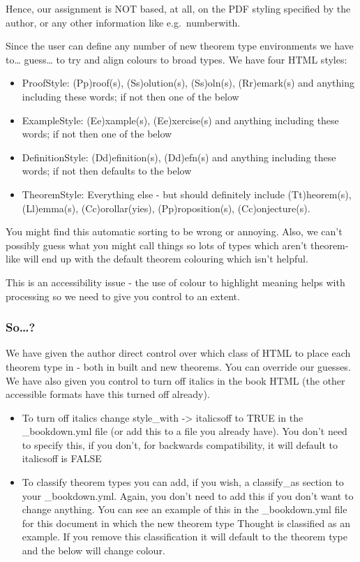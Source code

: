 \documentclass[
  10pt,
  a4paper]{article}
\providecommand{\tightlist}{%
  \setlength{\itemsep}{0pt}\setlength{\parskip}{0pt}}
\theoremstyle{plain}
\theoremstyle{definition}
\theoremstyle{plain}
\theoremstyle{plain}
\theoremstyle{plain}
\theoremstyle{plain}
\theoremstyle{definition}
\theoremstyle{definition}
\theoremstyle{remark}
\theoremstyle{remark}
\begin{document}
Hence, our assignment is NOT based, at all, on the PDF styling specified by the author, or any other information like e.g.~numberwith.

Since the user can define any number of new theorem type environments we have to\ldots{} guess\ldots{} to try and align colours to broad types. We have four HTML styles:

\begin{itemize}
\tightlist
\item
  ProofStyle: (P\textbar p)roof(s), (S\textbar s)olution(s), (S\textbar s)oln(s), (R\textbar r)emark(s) and anything including these words; if not then one of the below
\item
  ExampleStyle: (E\textbar e)xample(s), (E\textbar e)xercise(s) and anything including these words; if not then one of the below
\item
  DefinitionStyle: (D\textbar d)efinition(s), (D\textbar d)efn(s) and anything including these words; if not then defaults to the below
\item
  TheoremStyle: Everything else - but should definitely include (T\textbar t)heorem(s), (L\textbar l)emma(s), (C\textbar c)orollar(y\textbar ies), (P\textbar p)roposition(s), (C\textbar c)onjecture(s).
\end{itemize}

You might find this automatic sorting to be wrong or annoying. Also, we can't possibly guess what you might call things so lots of types which aren't theorem-like will end up with the default theorem colouring which isn't helpful.

This is an accessibility issue - the use of colour to highlight meaning helps with processing so we need to give you control to an extent.

\hypertarget{so}{%
\subsubsection{So\ldots?}\label{so}}

We have given the author direct control over which class of HTML to place each theorem type in - both in built and new theorems. You can override our guesses. We have also given you control to turn off italics in the book HTML (the other accessible formats have this turned off already).

\begin{itemize}
\tightlist
\item
  To turn off italics change style\_with -\textgreater{} italicsoff to TRUE in the \_bookdown.yml file (or add this to a file you already have). You don't need to specify this, if you don't, for backwards compatibility, it will default to italicsoff is FALSE
\item
  To classify theorem types you can add, if you wish, a classify\_as section to your \_bookdown.yml. Again, you don't need to add this if you don't want to change anything. You can see an example of this in the \_bookdown.yml file for this document in which the new theorem type Thought is classified as an example. If you remove this classification it will default to the theorem type and the below will change colour.
\end{itemize}
\end{document}
